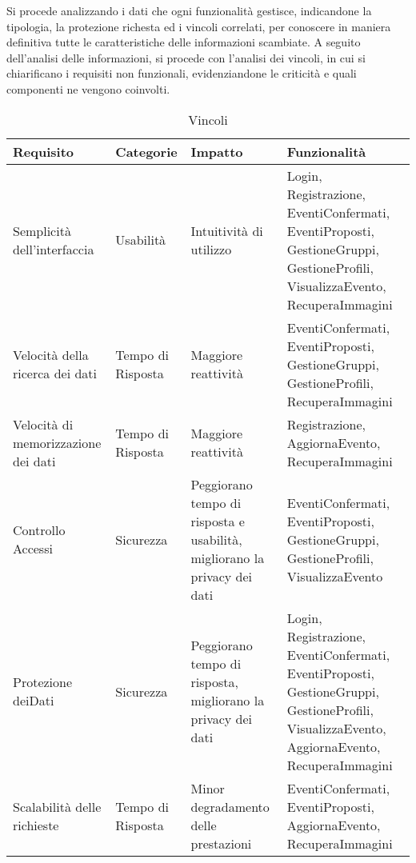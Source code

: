 Si procede analizzando i dati che ogni funzionalità gestisce, 
indicandone la tipologia, la protezione richesta ed i vincoli correlati,
per conoscere in maniera definitiva tutte le caratteristiche delle informazioni scambiate.
A seguito dell'analisi delle informazioni, si procede con l'analisi dei vincoli,
in cui si chiarificano i requisiti non funzionali, 
evidenziandone le criticità e quali componenti ne vengono coinvolti.\\


\begin{table}[htbp]
    \centering
    \begin{tabular} {|P{3.5cm}|P{2cm}|P{3.5cm}|P{6cm}|}
        \hline
        \textbf{Requisito}                  & \textbf{Categorie} & \textbf{Impatto}                                                         & \textbf{Funzionalità}                                                                                                                       \\
        \hline
        Semplicità dell'interfaccia         & Usabilità          & Intuitività di utilizzo                                                  & Login, Registrazione, EventiConfermati, EventiProposti, GestioneGruppi, GestioneProfili, VisualizzaEvento, RecuperaImmagini                 \\
        \hline
        Velocità della ricerca dei dati     & Tempo di Risposta  & Maggiore reattività                                                      & EventiConfermati, EventiProposti, GestioneGruppi, GestioneProfili, RecuperaImmagini                                                         \\
        \hline
        Velocità di memorizzazione dei dati & Tempo di Risposta  & Maggiore reattività                                                      & Registrazione, AggiornaEvento, RecuperaImmagini                                                                                             \\
        \hline
        Controllo Accessi                   & Sicurezza          & Peggiorano tempo di risposta e usabilità, migliorano la privacy dei dati & EventiConfermati, EventiProposti, GestioneGruppi, GestioneProfili, VisualizzaEvento                                                         \\
        \hline
        Protezione dei\linebreak Dati       & Sicurezza          & Peggiorano tempo di risposta, migliorano la privacy dei dati             & Login, Registrazione, EventiConfermati, EventiProposti, GestioneGruppi, GestioneProfili, VisualizzaEvento, AggiornaEvento, RecuperaImmagini \\
        \hline
        Scalabilità delle richieste         & Tempo di Risposta  & Minor degradamento delle prestazioni                                     & EventiConfermati, EventiProposti, AggiornaEvento, RecuperaImmagini                                                                          \\
        \hline
    \end{tabular}
    \caption{Vincoli}
\end{table}
\clearpage


